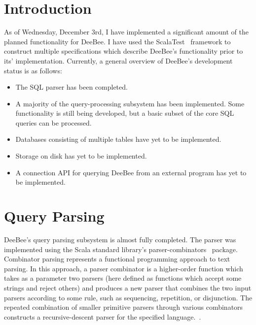 

\usepackage{minted}
\usepackage{hyperref}
\usepackage{cleveref}
\usepackage{lmodern}
\usepackage{placeins}


\MYHEADERS{}
\PLEDGE{}

\section{Introduction}

As of Wednesday, December 3rd, I have implemented a significant amount of the planned functionality for DeeBee. I have used the ScalaTest~\cite{vennersscalatest} framework to construct multiple specifications which describe DeeBee's functionality prior to its' implementation. Currently, a general overview of DeeBee's development status is as follows:
\begin{itemize}
    \item The SQL parser has been completed.
    \item A majority of the query-processing subsystem has been implemented. Some functionality is still being developed, but a basic subset of the core SQL queries can be processed.
    \item Databases consisting of multiple tables have yet to be implemented.
    \item Storage on disk has yet to be implemented.
    \item A connection API for querying DeeBee from an external program has yet to be implemented.
\end{itemize}

\section{Query Parsing}

DeeBee's query parsing subsystem is almost fully completed. The parser was implemented using the Scala standard library's parser-combinators~\cite{moors2008parser} package. Combinator parsing represents a functional programming approach to text parsing. In this approach, a parser combinator is a higher-order function which takes as a parameter two parsers (here defined as functions which accept some strings and reject others) and produces a new parser that combines the two input parsers according to some rule, such as sequencing, repetition, or disjunction. The repeated combination of smaller primitive parsers through various combinators constructs a recursive-descent parser for the specified language.~\cite{moors2008parser,swierstra2001combinator,fokker1995functional,frost2008parser}.

